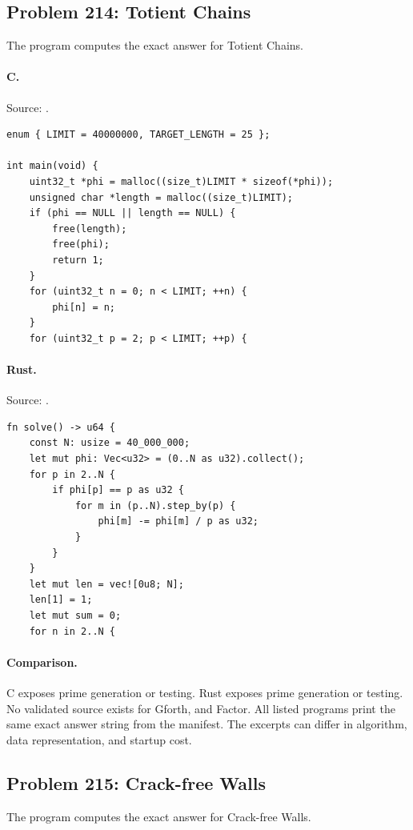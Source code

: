 \subsection{Problem 214: Totient Chains}
\label{walkthrough:p214}
The program computes the exact answer for Totient Chains.

\paragraph{C.} Source: .
\begin{lstlisting}
enum { LIMIT = 40000000, TARGET_LENGTH = 25 };

int main(void) {
    uint32_t *phi = malloc((size_t)LIMIT * sizeof(*phi));
    unsigned char *length = malloc((size_t)LIMIT);
    if (phi == NULL || length == NULL) {
        free(length);
        free(phi);
        return 1;
    }
    for (uint32_t n = 0; n < LIMIT; ++n) {
        phi[n] = n;
    }
    for (uint32_t p = 2; p < LIMIT; ++p) {
\end{lstlisting}

\paragraph{Rust.} Source: .
\begin{lstlisting}
fn solve() -> u64 {
    const N: usize = 40_000_000;
    let mut phi: Vec<u32> = (0..N as u32).collect();
    for p in 2..N {
        if phi[p] == p as u32 {
            for m in (p..N).step_by(p) {
                phi[m] -= phi[m] / p as u32;
            }
        }
    }
    let mut len = vec![0u8; N];
    len[1] = 1;
    let mut sum = 0;
    for n in 2..N {
\end{lstlisting}

\paragraph{Comparison.}
C exposes prime generation or testing. Rust exposes prime generation or testing.
No validated source exists for Gforth, and Factor.
All listed programs print the same exact answer string from the manifest. The excerpts can differ in algorithm, data representation, and startup cost.

\subsection{Problem 215: Crack-free Walls}
\label{walkthrough:p215}
The program computes the exact answer for Crack-free Walls.

